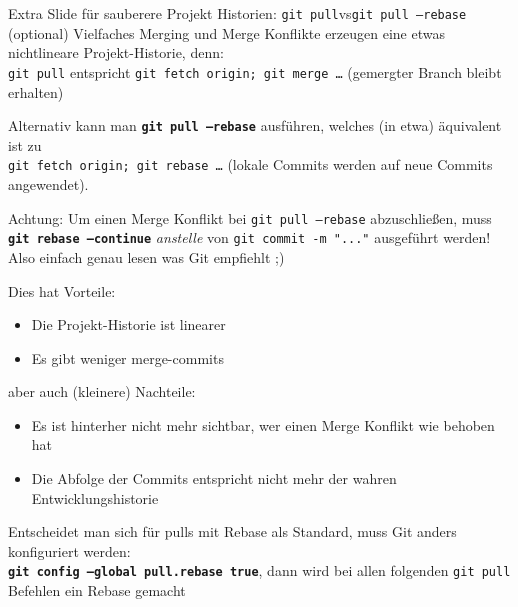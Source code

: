 \begin{frame}{Extra Slide für sauberere Projekt Historien: \texttt{git pull}\quad vs\quad\texttt{git pull --rebase} (optional)}
    Vielfaches Merging und Merge Konflikte erzeugen eine etwas nichtlineare Projekt-Historie, denn:\\
    \texttt{git pull} entspricht \texttt{git fetch origin; git merge …} (\to\;gemergter Branch bleibt erhalten)

    Alternativ kann man \texttt{\textbf{git pull --rebase}} ausführen, welches (in etwa) äquivalent ist zu\\\texttt{git fetch origin; git rebase …} (\to\;lokale Commits werden auf neue Commits angewendet).

    {\color{red} Achtung: Um einen Merge Konflikt bei \texttt{git pull --rebase} abzuschließen, muss \texttt{\textbf{git~rebase~--continue}} \emph{anstelle} von \texttt{git commit -m "..."} ausgeführt werden! Also einfach genau lesen was Git empfiehlt ;)}

    Dies hat Vorteile:
    \begin{itemize}
        \item Die Projekt-Historie ist linearer
        \item Es gibt weniger merge-commits
    \end{itemize}
    aber auch (kleinere) Nachteile:
    \begin{itemize}
        \item Es ist hinterher nicht mehr sichtbar, wer einen Merge Konflikt wie behoben hat
        \item Die Abfolge der Commits entspricht nicht mehr der wahren Entwicklungshistorie
    \end{itemize}
    Entscheidet man sich für pulls mit Rebase als Standard, muss Git anders konfiguriert werden:\\
    \texttt{\textbf{git config --global pull.rebase true}}, dann wird bei allen folgenden \texttt{git pull} Befehlen ein Rebase gemacht
\end{frame}

